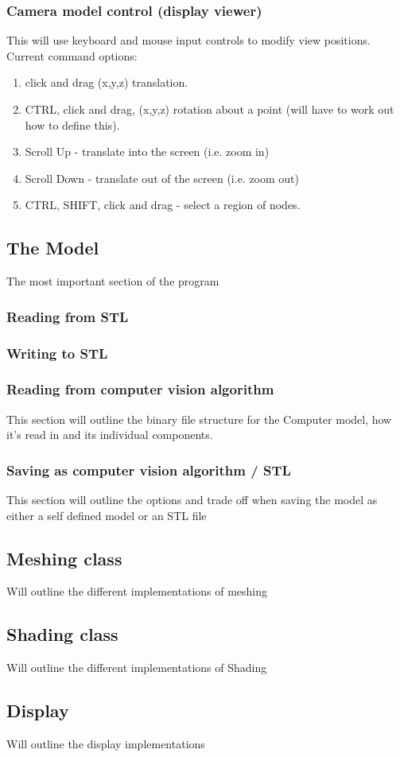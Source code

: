 \documentclass[11pt]{article}
\begin{document}
			\subsubsection{Camera model control (display viewer)}
				This will use keyboard and mouse input controls to modify view positions.
				Current command options: 
					\begin{enumerate}
						\item click and drag (x,y,z) translation.
						\item CTRL, click and drag, (x,y,z) rotation about a point (will have to work out how to define this). 
						\item Scroll Up - translate into the screen (i.e. zoom in)
						\item Scroll Down - translate out of the screen (i.e. zoom out)
						\item CTRL, SHIFT, click and drag - select a region of nodes. 
					\end{enumerate}
		
		\subsection{The Model}
			The most important section of the program
			
			\subsubsection{Reading from STL} %
			\subsubsection{Writing to STL} %
			
			\subsubsection{Reading from computer vision algorithm} 
				This section will outline the binary file structure for the Computer model, how it's read in and its individual components. 
				
			\subsubsection{Saving as computer vision algorithm / STL} 
				This section will outline the options and trade off when saving the model as either a self defined model or an STL file
			
		\subsection{Meshing class} 
			Will outline the different implementations of meshing
		
		\subsection{Shading class} 
			Will outline the different implementations of Shading
		
		\subsection{Display} 
			Will outline the display implementations
			
			
\end{document}
